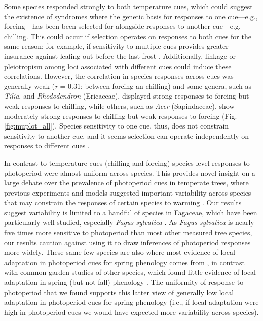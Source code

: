 \documentclass[11pt]{article}
\begin{document}
Some species responded strongly to both temperature cues, which could suggest the existence of syndromes where the genetic basis for responses to one cue---e.g., forcing---has been been selected for alongside responses to another cue---e.g. chilling. This could occur if selection operates on responses to both cues for the same reason; for example, if sensitivity to multiple cues provides greater insurance against leafing out before the last frost \citep{bonamour2019,memegan2021}. Additionally, linkage or pleiotropism among loci associated with different cues \citep{nakagawa2005} could induce these correlations. However, the correlation in species responses across cues was generally weak (\emph{r} = 0.31; between forcing an chilling) and some genera, such as \emph{Tilia}, and \emph{Rhododendron} (Ericaceae), displayed strong responses to forcing but weak responses to chilling, while others, such as \emph{Acer} (Sapindaceae), show moderately strong responses to chilling but weak responses to forcing (Fig. \ref{fig:muplot_all}). Species sensitivity to one cue, thus, does not constrain sensitivity to another cue, and it seems selection can operate independently on responses to different cues \citep{bonamour2019}.

In contrast to temperature cues (chilling and forcing) species-level responses to photoperiod were almost uniform across species. This provides novel insight on a large debate over the prevalence of photoperiod cues in temperate trees, where previous experiments \citep{Basler:2012,zohner2016} and models \citep[e.g.,][]{Hunter:1992jw,schaber20203} suggested important variability across species that may constrain the responses of certain species to warming \citep{way2015}. Our results suggest variability is limited to a handful of species in Fagaceae, which have been particularly well studied, especially \emph{Fagus sylvatica} \citep[e.g.,][]{Basler:2012,zohner2016,kramer2017}. As \emph{Fagus sylvatica} is nearly five times more sensitive to photoperiod than most other measured tree species, our results caution against using it to draw inferences of photoperiod responses more widely. These same few species are also where most evidence of local adaptation in photoperiod cues for spring phenology comes from \citep[e.g.,][]{kramer2017}, in contrast with common garden studies of other species, which found little evidence of local adaptation in spring (but not fall) phenology \citep{aitken2016}. The uniformity of response to photoperiod that we found supports this latter view of generally low local adaptation in photoperiod cues for spring phenology (i.e., if local adaptation were high in photoperiod cues we would have expected more variability across species). 
\end{document}
